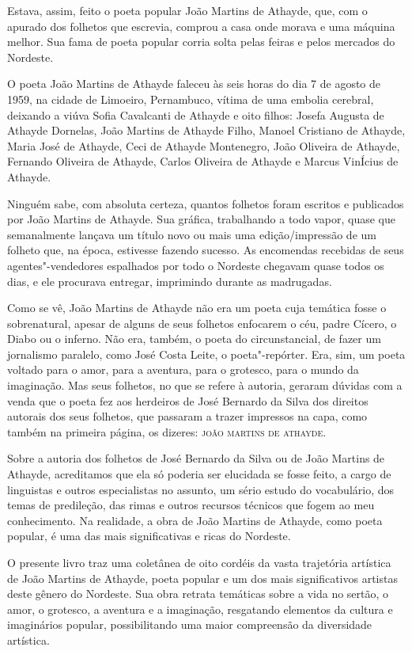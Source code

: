 \documentclass[12pt]{extarticle}
\begin{document}
Estava, assim, feito o poeta popular João Martins de Athayde, que, com
o apurado dos folhetos que escrevia, comprou a casa onde morava e uma máquina
melhor. Sua fama de poeta popular corria solta pelas feiras e pelos mercados do
Nordeste.

O poeta João Martins de Athayde faleceu às seis horas do dia 7 de agosto de
1959, na cidade de Limoeiro, Pernambuco, vítima de uma embolia cerebral,
deixando a viúva Sofia Cavalcanti de Athayde e oito filhos: Josefa Augusta de
Athayde Dornelas, João Martins de Athayde Filho, Manoel Cristiano de Athayde,
Maria José de Athayde, Ceci de Athayde Montenegro, João Oliveira de Athayde,
Fernando Oliveira de Athayde, Carlos Oliveira de Athayde e Marcus VinÍcius de
Athayde.

Ninguém sabe, com absoluta certeza, quantos folhetos foram escritos
e publicados por João Martins de Athayde. Sua gráfica, trabalhando a todo
vapor, quase que semanalmente lançava um título novo ou mais uma
edição/impressão de um folheto que, na época, estivesse fazendo sucesso.  As
encomendas recebidas de seus agentes"-vendedores espalhados por todo o Nordeste
chegavam quase todos os dias, e ele procurava entregar, imprimindo durante as
madrugadas.

Como se vê, João Martins de Athayde não era um poeta cuja temática fosse
o sobrenatural, apesar de alguns de seus folhetos enfocarem o céu, padre
Cícero, o Diabo ou o inferno. Não era, também, o poeta do circunstancial, de
fazer um jornalismo paralelo, como José Costa Leite, o poeta"-repórter. Era,
sim, um poeta voltado para o amor, para a aventura, para o grotesco, para
o mundo da imaginação. Mas seus folhetos, no que se refere à autoria, geraram
dúvidas com a venda que o poeta fez aos herdeiros de José Bernardo da Silva dos
direitos autorais dos seus folhetos, que passaram a trazer impressos na capa,
como também na primeira página, os dizeres: \textsc{joão martins de athayde}.

Sobre a autoria dos folhetos de José Bernardo da Silva ou de João Martins de
Athayde, acreditamos que ela só poderia ser elucidada se fosse feito, a cargo
de linguistas e outros especialistas no assunto, um sério estudo do
vocabulário, dos temas de predileção, das rimas e outros recursos técnicos que
fogem ao meu conhecimento. Na realidade, a obra de João Martins de Athayde,
como poeta popular, é uma das mais significativas e ricas do Nordeste.

O presente livro traz uma coletânea de oito cordéis da vasta trajetória
artística de João Martins de Athayde, poeta popular e um dos mais
significativos artistas deste gênero do Nordeste. Sua obra retrata temáticas
sobre a vida no sertão, o amor, o grotesco, a aventura e a imaginação,
resgatando elementos da cultura e imaginários popular, possibilitando uma maior
compreensão da diversidade artística.
\end{document}
